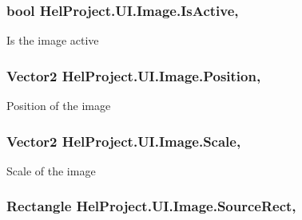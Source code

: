 \subsubsection[{Is\+Active}]{\setlength{\rightskip}{0pt plus 5cm}bool Hel\+Project.\+U\+I.\+Image.\+Is\+Active\hspace{0.3cm}{\ttfamily [get]}, {\ttfamily [set]}}\label{class_hel_project_1_1_u_i_1_1_image_a72bf2602af719c9760401cdfc60833fb}


Is the image active 

\hypertarget{class_hel_project_1_1_u_i_1_1_image_a5411311ded8aaad6a7701ebf85cf4195}{}
\subsubsection[{Position}]{\setlength{\rightskip}{0pt plus 5cm}Vector2 Hel\+Project.\+U\+I.\+Image.\+Position\hspace{0.3cm}{\ttfamily [get]}, {\ttfamily [set]}}\label{class_hel_project_1_1_u_i_1_1_image_a5411311ded8aaad6a7701ebf85cf4195}


Position of the image 

\hypertarget{class_hel_project_1_1_u_i_1_1_image_aaee02769150fffb97a56c2883b679054}{}
\subsubsection[{Scale}]{\setlength{\rightskip}{0pt plus 5cm}Vector2 Hel\+Project.\+U\+I.\+Image.\+Scale\hspace{0.3cm}{\ttfamily [get]}, {\ttfamily [set]}}\label{class_hel_project_1_1_u_i_1_1_image_aaee02769150fffb97a56c2883b679054}


Scale of the image 

\hypertarget{class_hel_project_1_1_u_i_1_1_image_a1a24007d692268d32842ec757a5c1c9c}{}
\subsubsection[{Source\+Rect}]{\setlength{\rightskip}{0pt plus 5cm}Rectangle Hel\+Project.\+U\+I.\+Image.\+Source\+Rect\hspace{0.3cm}{\ttfamily [get]}, {\ttfamily [set]}}\label{class_hel_project_1_1_u_i_1_1_image_a1a24007d692268d32842ec757a5c1c9c}


